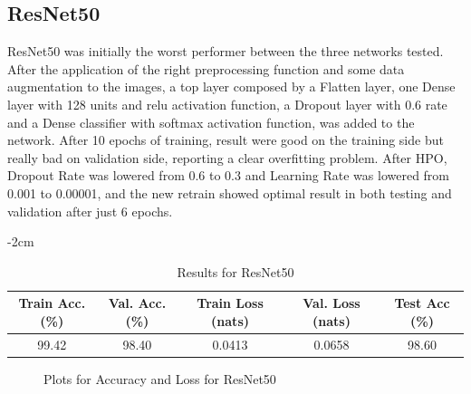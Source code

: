 \subsection{ResNet50}
ResNet50 was initially the worst performer between the three networks tested. After the application of the right preprocessing function and some data augmentation to the images, a top layer composed by a Flatten layer, one Dense layer with 128 units and relu activation function, a Dropout layer with 0.6 rate and a Dense classifier with softmax activation function, was added to the network. After 10 epochs of training, result were good on the training side but really bad on validation side, reporting a clear overfitting problem. After HPO, Dropout Rate was lowered from 0.6 to 0.3 and Learning Rate was lowered from 0.001 to 0.00001, and the new retrain showed optimal result in both testing and validation after just 6 epochs.
\begin{table}
	\centering
	\addtolength{\leftskip} {-2cm} %
	\addtolength{\rightskip}{-2cm}
	\begin{tabular}{ |c|c|c|c|c| }
		\hline
		Train Acc.(\%) & Val. Acc.(\%) & Train Loss (nats) & Val. Loss (nats) & Test Acc (\%)\\
		\hline
		99.42 & 98.40 & 0.0413 & 0.0658 & 98.60\\
		\hline
	\end{tabular}
	\caption{Results for ResNet50}
	\label{table:resnet50_res}
\end{table}

\begin{figure}[H]
\centering
{}
\hfill
{}
\caption{Plots for Accuracy and Loss for ResNet50}
\end{figure}

